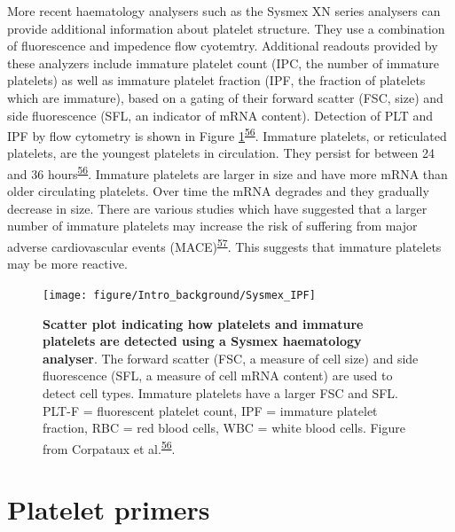 \documentclass[11pt,twoside]{bristolthesis}
\begin{document}
More recent haematology analysers such as the Sysmex XN series analysers can provide additional information about platelet structure. They use a combination of fluorescence and impedence flow cyotemtry. Additional readouts provided by these analyzers include immature platelet count (IPC, the number of immature platelets) as well as immature platelet fraction (IPF, the fraction of platelets which are immature), based on a gating of their forward scatter (FSC, size) and side fluorescence (SFL, an indicator of mRNA content). Detection of PLT and IPF by flow cytometry is shown in Figure \ref{fig:sysmex-ipf}\textsuperscript{\protect\hyperlink{ref-Corpataux2020}{56}}. Immature platelets, or reticulated platelets, are the youngest platelets in circulation. They persist for between 24 and 36 hours\textsuperscript{\protect\hyperlink{ref-Corpataux2020}{56}}. Immature platelets are larger in size and have more mRNA than older circulating platelets. Over time the mRNA degrades and they gradually decrease in size. There are various studies which have suggested that a larger number of immature platelets may increase the risk of suffering from major adverse cardiovascular events (MACE)\textsuperscript{\protect\hyperlink{ref-Ibrahim2014}{57}}. This suggests that immature platelets may be more reactive.



\begin{figure}
\texttt{[image: figure/Intro\_background/Sysmex\_IPF]} \caption[Scatter plot indicating how platelets are immature platelets are detected using a Sysmex haematology analyser]{\textbf{Scatter plot indicating how platelets and immature platelets are detected using a Sysmex haematology analyser}. The forward scatter (FSC, a measure of cell size) and side fluorescence (SFL, a measure of cell mRNA content) are used to detect cell types. Immature platelets have a larger FSC and SFL. PLT-F = fluorescent platelet count, IPF = immature platelet fraction, RBC = red blood cells, WBC = white blood cells. Figure from Corpataux et al.\textsuperscript{\protect\hyperlink{ref-Corpataux2020}{56}}.}\label{fig:sysmex-ipf}
\end{figure}
\hypertarget{platelet-primers}{%
\section{Platelet primers}\label{platelet-primers}}
\end{document}
